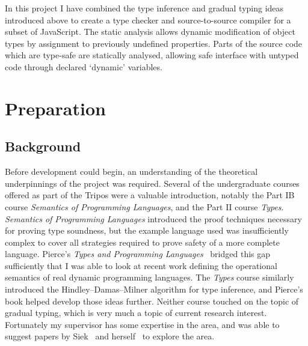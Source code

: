 \documentclass[12pt,a4paper,twoside,openright]{report}
\begin{document}
In this project I have combined the type inference and gradual typing ideas
introduced above to create a type checker and source-to-source compiler for a
subset of JavaScript. The static analysis allows dynamic modification of
object types by assignment to previously undefined properties. Parts of the
source code which are type-safe are statically analysed, allowing safe
interface with untyped code through declared `dynamic' variables.

\chapter{Preparation}\label{preparation} \section{Background}
Before development could begin, an understanding of the theoretical
underpinnings of the project was required. Several of the undergraduate courses
offered as part of the Tripos were a valuable introduction, notably the Part IB
course \textit{Semantics of Programming Languages}, and the Part II course
\textit{Types}. \textit{Semantics of Programming Languages} introduced the
proof techniques necessary for proving type soundness, but the example language
used was insufficiently complex to cover all strategies required to prove
safety of a more complete language. Pierce's \textit{Types and Programming
Languages}~\cite{pierce} bridged this gap sufficiently that I was able to look
at recent work defining the operational semantics of real dynamic programming
languages\cite{pythonOpSem}. The \textit{Types} course similarly introduced the
Hindley--Damas--Milner algorithm for type inference, and Pierce's book helped
develop those ideas further. Neither course touched on the topic of gradual
typing, which is very much a topic of current research interest. Fortunately my
supervisor has some expertise in the area, and was able to suggest papers by
Siek~\cite{gradSiek, gradSiek2} and herself~\cite{gradGray} to explore the
area.
\end{document}
